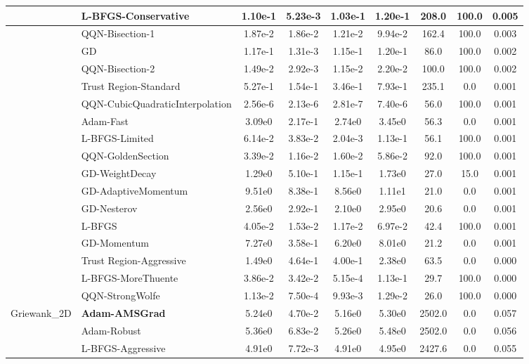\documentclass[10pt]{article}
\begin{document}
\begin{longtable}{|l|l|c|c|c|c|c|c|c|}
 & L-BFGS-Conservative & 1.10e-1 & 5.23e-3 & 1.03e-1 & 1.20e-1 & 208.0 & 100.0 & 0.005 \\
\hline
 & QQN-Bisection-1 & 1.87e-2 & 1.86e-2 & 1.21e-2 & 9.94e-2 & 162.4 & 100.0 & 0.003 \\
\hline
 & GD & 1.17e-1 & 1.31e-3 & 1.15e-1 & 1.20e-1 & 86.0 & 100.0 & 0.002 \\
\hline
 & QQN-Bisection-2 & 1.49e-2 & 2.92e-3 & 1.15e-2 & 2.20e-2 & 100.0 & 100.0 & 0.002 \\
\hline
 & Trust Region-Standard & 5.27e-1 & 1.54e-1 & 3.46e-1 & 7.93e-1 & 235.1 & 0.0 & 0.001 \\
\hline
 & QQN-CubicQuadraticInterpolation & 2.56e-6 & 2.13e-6 & 2.81e-7 & 7.40e-6 & 56.0 & 100.0 & 0.001 \\
\hline
 & Adam-Fast & 3.09e0 & 2.17e-1 & 2.74e0 & 3.45e0 & 56.3 & 0.0 & 0.001 \\
\hline
 & L-BFGS-Limited & 6.14e-2 & 3.83e-2 & 2.04e-3 & 1.13e-1 & 56.1 & 100.0 & 0.001 \\
\hline
 & QQN-GoldenSection & 3.39e-2 & 1.16e-2 & 1.60e-2 & 5.86e-2 & 92.0 & 100.0 & 0.001 \\
\hline
 & GD-WeightDecay & 1.29e0 & 5.10e-1 & 1.15e-1 & 1.73e0 & 27.0 & 15.0 & 0.001 \\
\hline
 & GD-AdaptiveMomentum & 9.51e0 & 8.38e-1 & 8.56e0 & 1.11e1 & 21.0 & 0.0 & 0.001 \\
\hline
 & GD-Nesterov & 2.56e0 & 2.92e-1 & 2.10e0 & 2.95e0 & 20.6 & 0.0 & 0.001 \\
\hline
 & L-BFGS & 4.05e-2 & 1.53e-2 & 1.17e-2 & 6.97e-2 & 42.4 & 100.0 & 0.001 \\
\hline
 & GD-Momentum & 7.27e0 & 3.58e-1 & 6.20e0 & 8.01e0 & 21.2 & 0.0 & 0.001 \\
\hline
 & Trust Region-Aggressive & 1.49e0 & 4.64e-1 & 4.00e-1 & 2.38e0 & 63.5 & 0.0 & 0.000 \\
\hline
 & L-BFGS-MoreThuente & 3.86e-2 & 3.42e-2 & 5.15e-4 & 1.13e-1 & 29.7 & 100.0 & 0.000 \\
\hline
 & QQN-StrongWolfe & 1.13e-2 & 7.50e-4 & 9.93e-3 & 1.29e-2 & 26.0 & 100.0 & 0.000 \\
Griewank\_2D & \textbf{Adam-AMSGrad} & 5.24e0 & 4.70e-2 & 5.16e0 & 5.30e0 & 2502.0 & 0.0 & 0.057 \\
\hline
 & Adam-Robust & 5.36e0 & 6.83e-2 & 5.26e0 & 5.48e0 & 2502.0 & 0.0 & 0.056 \\
\hline
 & L-BFGS-Aggressive & 4.91e0 & 7.72e-3 & 4.91e0 & 4.95e0 & 2427.6 & 0.0 & 0.055 \\

\end{longtable}
\end{document}
